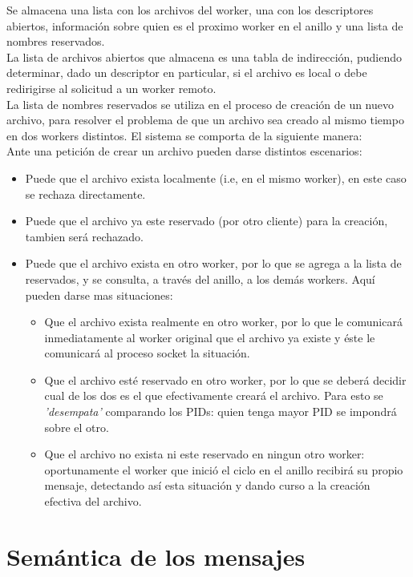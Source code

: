 \documentclass[a4paper, 11pt]{article}
\begin{document}
Se almacena una lista con los archivos del worker, una con los descriptores abiertos, información sobre quien es el proximo worker en el anillo y una lista de nombres reservados. \\

La lista de archivos abiertos que almacena es una tabla de indirección, pudiendo determinar, dado un descriptor en particular, si el archivo es local o debe redirigirse al solicitud a un worker remoto. \\

La lista de nombres reservados se utiliza en el proceso de creación de un nuevo archivo, para resolver el problema de que un archivo sea creado al mismo tiempo en dos workers distintos. El sistema se comporta de la siguiente manera:\\

Ante una petición de crear un archivo pueden darse distintos escenarios:
\begin{itemize}
   \item Puede que el archivo exista localmente (i.e, en el mismo worker), en este caso se rechaza directamente.
   \item Puede que el archivo ya este reservado (por otro cliente) para la creación, tambien será rechazado.
   \item Puede que el archivo exista en otro worker, por lo que se agrega a la lista de reservados, y se consulta, a través del anillo, a los demás workers. Aquí pueden darse mas situaciones:
   \begin{itemize}
     \item Que el archivo exista realmente en otro worker, por lo que le comunicará inmediatamente al worker original que el archivo ya existe y éste le comunicará al proceso socket la situación.
     \item Que el archivo esté reservado en otro worker, por lo que se deberá decidir cual de los dos es el que efectivamente creará el archivo. Para esto se \textit{'desempata'} comparando los PIDs: quien tenga mayor PID se impondrá sobre el otro.
     \item Que el archivo no exista ni este reservado en ningun otro worker: oportunamente el worker que inició el ciclo en el anillo recibirá su propio mensaje, detectando así esta situación y dando curso a la creación efectiva del archivo.
\end{itemize}
\end{itemize}

\section*{Semántica de los mensajes}
\end{document}
